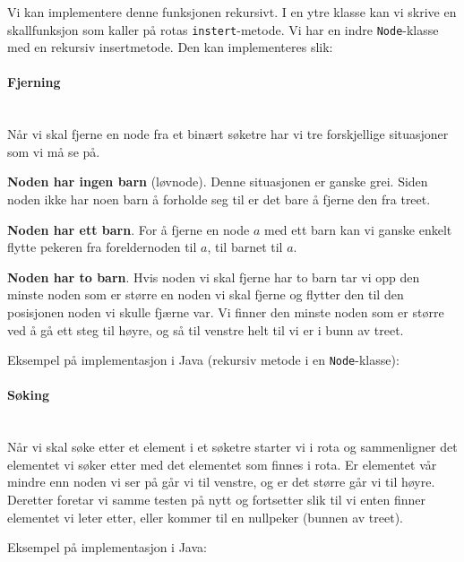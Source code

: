 Vi kan implementere denne funksjonen rekursivt. I en ytre klasse kan vi skrive en skallfunksjon som kaller på rotas \verb|instert|-metode. Vi har en indre \verb|Node|-klasse med en rekursiv insertmetode. Den kan implementeres slik:
~\\

\paragraph{Fjerning}~\\
Når vi skal fjerne en node fra et binært søketre har vi tre forskjellige situasjoner som vi må se på.

{\bfseries Noden har ingen barn} (løvnode). Denne situasjonen er ganske grei. Siden noden ikke har noen barn å forholde seg til er det bare å fjerne den fra treet.

{\bfseries Noden har ett barn}. For å fjerne en node $ a $ med ett barn kan vi ganske enkelt flytte pekeren fra foreldernoden til $ a $, til barnet til $ a $.

{\bfseries Noden har to barn}. Hvis noden vi skal fjerne har to barn tar vi opp den minste noden som er større en noden vi skal fjerne og flytter den til den posisjonen noden vi skulle fjærne var. Vi finner den minste noden som er større ved å gå ett steg til høyre, og så til venstre helt til vi er i bunn av treet. 

Eksempel på implementasjon i Java (rekursiv metode i en \verb|Node|-klasse):
~\\

\paragraph{Søking}~\\
Når vi skal søke etter et element i et søketre starter vi i rota og sammenligner det elementet vi søker etter med det elementet som finnes i rota. Er elementet vår mindre enn noden vi ser på går vi til venstre, og er det større går vi til høyre. Deretter foretar vi samme testen på nytt og fortsetter slik til vi enten finner elementet vi leter etter, eller kommer til en nullpeker (bunnen av treet).

Eksempel på implementasjon i Java:
~\\




~\\~\\
